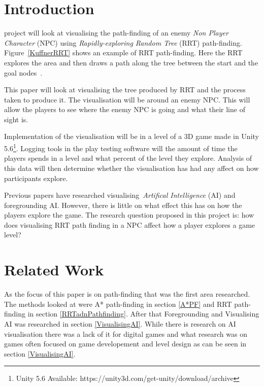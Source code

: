 \documentclass[journal]{IEEEtran}
\begin{document}
\section{Introduction} \label{introduction}
% 
% 
% 
% 
 project will look at visualising the path-finding of an enemy \textit{Non Player Character} (NPC) using \textit{Rapidly-exploring Random Tree} (RRT) path-finding.  Figure~\ref{KuffnerRRT} shows an example of RRT path-finding. Here the RRT explores the area and then draws a path along the tree between the start and the goal nodes~\cite{Kuffner2000}. 

This paper will look at visualising the tree produced by RRT and the process taken to produce it. The visualisation will be around an enemy NPC. This will allow the players to see where the enemy NPC is going and what their line of sight is. 

Implementation of the visualisation will be in a level of a 3D game made in Unity 5.6\footnote[1]{Unity 5.6 Available: https://unity3d.com/get-unity/download/archive}. Logging tools in the play testing software will  the amount of time the players spends in a level and what percent of the level they explore. Analysis of this data will then determine whether the visualisation has had any affect on how participants explore.

Previous papers have researched visualising~\textit{Artifical Intelligence} (AI) and foregrounding AI. However, there is little on what effect this has on how the players explore the game.
The research question proposed in this project is: how does visualising RRT path finding in a NPC affect how a player explores a game level?

\section{Related Work} \label{RelatedWork}
As the focus of this paper is on path-finding that was the first area researched. The methods looked at were A* path-finding in section \ref{A*PF} and RRT path-finding in section \ref{RRTadnPathfinding}.  After that Foregrounding and Visualising AI was researched in section \ref{VisualisingAI}. While there is research on AI visualisation there was a lack of it for digital games and what research was on games often focused on game developement and level design as can be seen in section \ref{VisualisingAI}. 
\end{document}
